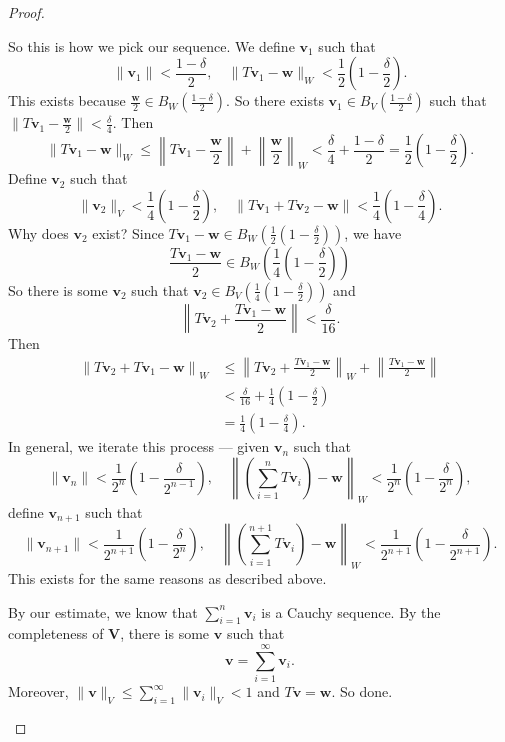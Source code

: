 \documentclass[a4paper]{article}
\begin{document}
\begin{proof}
\begin{enumerate}
      So this is how we pick our sequence. We define $\mathbf{v}_1$ such that
      \[
        \|\mathbf{v}_1\| < \frac{1 - \delta}{2}, \quad \|T\mathbf{v}_1 - \mathbf{w}\|_W < \frac{1}{2}\left(1 - \frac{\delta}{2}\right).
      \]
      This exists because $\frac{\mathbf{w}}{2} \in B_W\left(\frac{1 - \delta}{2}\right)$. So there exists $\mathbf{v}_1 \in B_V\left(\frac{1 - \delta}{2}\right)$ such that $\|T\mathbf{v}_1 - \frac{\mathbf{w}}{2}\| < \frac{\delta}{4}$. Then
      \[
        \|T\mathbf{v}_1 - \mathbf{w}\|_W \leq \left\|T\mathbf{v}_1 - \frac{\mathbf{w}}{2}\right\| + \left\|\frac{\mathbf{w}}{2}\right\|_W < \frac{\delta}{4} + \frac{1 - \delta}{2} = \frac{1}{2}\left(1 - \frac{\delta}{2}\right).
      \]
      Define $\mathbf{v}_2$ such that
      \[
        \|\mathbf{v}_2\|_V < \frac{1}{4}\left(1 - \frac{\delta}{2}\right), \quad \|T\mathbf{v}_1 + T\mathbf{v}_2 - \mathbf{w}\| < \frac{1}{4}\left(1 - \frac{\delta}{4}\right).
      \]
      Why does $\mathbf{v}_2$ exist? Since $T \mathbf{v}_1 - \mathbf{w} \in B_W\left(\frac{1}{2}\left(1 - \frac{\delta}{2}\right)\right)$, we have
      \[
        \frac{T\mathbf{v}_1 - \mathbf{w}}{2}\in B_W\left(\frac{1}{4}\left(1 - \frac{\delta}{2}\right)\right)
      \]
      So there is some $\mathbf{v}_2$ such that $\mathbf{v}_2 \in B_V\left(\frac{1}{4}\left(1 - \frac{\delta}{2}\right)\right)$ and
      \[
        \left\|T\mathbf{v}_2 + \frac{T\mathbf{v}_1 - \mathbf{w}}{2}\right\| < \frac{\delta}{16}.
      \]
      Then
      \begin{align*}
        \left\|T\mathbf{v}_2 + T\mathbf{v}_1 - \mathbf{w}\right\|_W &\leq \left\|T\mathbf{v}_2 + \frac{T\mathbf{v}_1 - \mathbf{w}}{2}\right\|_W + \left\|\frac{T\mathbf{v}_1 - \mathbf{w}}{2}\right\| \\
        &< \frac{\delta}{16} + \frac{1}{4}\left(1 - \frac{\delta}{2}\right) \\
        &= \frac{1}{4}\left(1 - \frac{\delta}{4}\right).
      \end{align*}
      In general, we iterate this process --- given $\mathbf{v}_n$ such that
      \[
        \|\mathbf{v}_n\| < \frac{1}{2^n}\left(1 - \frac{\delta}{2^{n - 1}}\right),\quad \left\|\left(\sum_{i = 1}^n T\mathbf{v}_i\right) - \mathbf{w}\right\|_W < \frac{1}{2^n} \left(1 - \frac{\delta}{2^n}\right),
      \]
      define $\mathbf{v}_{n + 1}$ such that
      \[
        \|\mathbf{v}_{n + 1}\| < \frac{1}{2^{n + 1}}\left(1 - \frac{\delta}{2^n}\right),\quad \left\|\left(\sum_{i = 1}^{n + 1} T\mathbf{v}_i\right) - \mathbf{w}\right\|_W < \frac{1}{2^{n + 1}} \left(1 - \frac{\delta}{2^{n + 1}}\right).
      \]
      This exists for the same reasons as described above.

      By our estimate, we know that $\sum_{i = 1}^n \mathbf{v}_i$ is a Cauchy sequence. By the completeness of $\mathbf{V}$, there is some $\mathbf{v}$ such that
      \[
        \mathbf{v} = \sum_{i = 1}^\infty \mathbf{v}_i.
      \]
      Moreover, $\|\mathbf{v}\|_V \leq \sum_{i = 1}^\infty \|\mathbf{v}_i\|_V < 1$ and $T\mathbf{v} = \mathbf{w}$. So done.
  \end{enumerate}
\end{proof}
\end{document}
